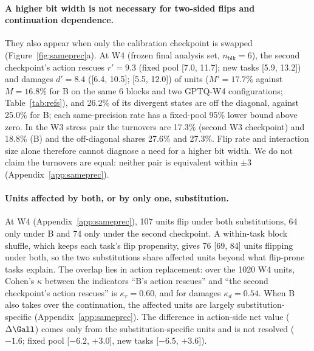 \paragraph{A higher bit width is not necessary for two-sided flips and continuation dependence.} They also appear when only the calibration checkpoint is swapped (Figure~\ref{fig:sameprec}a). At W4 (frozen final analysis set, $n_{\mathrm{blk}}=6$), the second checkpoint's action rescues $r'=9.3$ (fixed pool [7.0, 11.7]; new tasks [5.9, 13.2]) and damages $d'=8.4$ ([6.4, 10.5]; [5.5, 12.0])\pp{} of units ($M'=17.7$\% against $M=16.8$\% for B on the same 6 blocks and two GPTQ-W4 configurations; Table~\ref{tab:refs}), and 26.2\% of its divergent states are off the diagonal, against 25.0\% for B; each same-precision rate has a fixed-pool 95\% lower bound above zero. %
In the W3 stress pair the turnovers are 17.3\% (second W3 checkpoint) and 18.8\% (B) and the off-diagonal shares 27.6\% and 27.3\%. Flip rate and interaction size alone therefore cannot diagnose a need for a higher bit width. We do not claim the turnovers are equal: neither pair is equivalent within $\pm$3\pp{} (Appendix~\ref{app:sameprec}). %

\paragraph{Units affected by both, or by only one, substitution.} At W4 (Appendix~\ref{app:sameprec}), 107 units flip under both substitutions, 64 only under B and 74 only under the second checkpoint. A within-task block shuffle, which keeps each task's flip propensity, gives 76 [69, 84] units flipping under both, so the two substitutions share affected units beyond what flip-prone tasks explain. %
The overlap lies in action replacement: over the 1020 W4 units, Cohen's $\kappa$ between the indicators ``B's action rescues'' and ``the second checkpoint's action rescues'' is $\kappa_r=0.60$, and for damages $\kappa_d=0.54$. When B also takes over the continuation, the affected units are largely substitution-specific (Appendix~\ref{app:sameprec}). The difference in action-side net value ($\Delta\Gall$) comes only from the substitution-specific units and is not resolved ($-1.6$\pp{}; fixed pool [$-6.2$, $+3.0$], new tasks [$-6.5$, $+3.6$]). %

